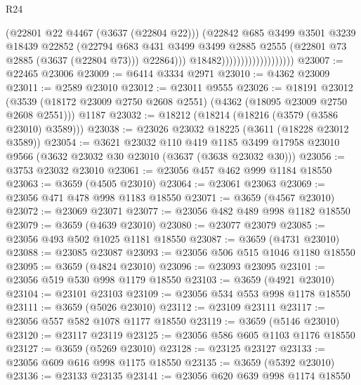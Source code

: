 \begin{lexlean}{R24}
\begin{coremodule}
                                            (@22801 @22 @4467 (@3637 (@22804 @22)))
                                            (@22842
                                              @685
                                              @3499
                                              @3501
                                              @3239
                                              @18439
                                              @22852
                                              (@22794
                                                @683
                                                @431
                                                @3499
                                                @3499
                                                @2885
                                                @2555
                                                (@22801 @73 @2885 (@3637 (@22804 @73)))
                                                @22864)))
                                          @18482)))))))))))))))))))
@23007 := @22465 @23006
@23009 := @6414 @3334 @2971
@23010 := @4362 @23009
@23011 := @2589 @23010
@23012 := @23011 @9555
@23026 := @18191
    @23012
    (@3539 (@18172 @23009 @2750 @2608 @2551) (@4362 (@18095 @23009 @2750 @2608 @2551)))
    @1187
@23032 := @18212 (@18214 (@18216 (@3579 (@3586 @23010) @3589)))
@23038 := @23026 @23032 @18225 (@3611 (@18228 @23012 @3589))
@23054 := @3621
    @23032
    @110
    @419
    @1185
    @3499
    @17958
    @23010
    @9566
    (@3632 @23032 @30 @23010 (@3637 (@3638 @23032 @30)))
@23056 := @3753 @23032 @23010
@23061 := @23056 @457 @462 @999 @1184 @18550
@23063 := @3659 (@4505 @23010)
@23064 := @23061 @23063
@23069 := @23056 @471 @478 @998 @1183 @18550
@23071 := @3659 (@4567 @23010)
@23072 := @23069 @23071
@23077 := @23056 @482 @489 @998 @1182 @18550
@23079 := @3659 (@4639 @23010)
@23080 := @23077 @23079
@23085 := @23056 @493 @502 @1025 @1181 @18550
@23087 := @3659 (@4731 @23010)
@23088 := @23085 @23087
@23093 := @23056 @506 @515 @1046 @1180 @18550
@23095 := @3659 (@4824 @23010)
@23096 := @23093 @23095
@23101 := @23056 @519 @530 @998 @1179 @18550
@23103 := @3659 (@4921 @23010)
@23104 := @23101 @23103
@23109 := @23056 @534 @553 @998 @1178 @18550
@23111 := @3659 (@5026 @23010)
@23112 := @23109 @23111
@23117 := @23056 @557 @582 @1078 @1177 @18550
@23119 := @3659 (@5146 @23010)
@23120 := @23117 @23119
@23125 := @23056 @586 @605 @1103 @1176 @18550
@23127 := @3659 (@5269 @23010)
@23128 := @23125 @23127
@23133 := @23056 @609 @616 @998 @1175 @18550
@23135 := @3659 (@5392 @23010)
@23136 := @23133 @23135
@23141 := @23056 @620 @639 @998 @1174 @18550

\end{coremodule}
\end{lexlean}

